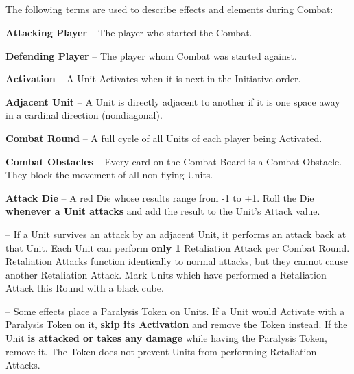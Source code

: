 \begin{multicols*}{2}
\subsection*{}
The following terms are used to describe effects and elements during Combat:\par
\textbf{Attacking Player} – The player who started the Combat.\par
\textbf{Defending Player} – The player whom Combat was started against.\par
\textbf{Activation} – A Unit Activates when it is next in the Initiative order.\par
\textbf{Adjacent Unit} – A Unit is directly adjacent to another if it is one space away in a cardinal direction (nondiagonal).\par
\textbf{Combat Round} – A full cycle of all Units of each player being Activated.\par
\textbf{Combat Obstacles} – Every card on the Combat Board is a Combat Obstacle.
They block the movement of all non-flying Units.\smallskip\par
{}\parbox{0.7\hsize}{\textbf{Attack Die} – A red Die whose results range from -1 to +1.
Roll the Die \textbf{whenever a Unit attacks} and
add the result to the Unit's Attack value.}\par\smallskip
\textbf{} – If a Unit survives an attack by an adjacent Unit, it performs an attack back at that Unit.
Each Unit can perform \textbf{only 1} Retaliation Attack per Combat Round.
Retaliation Attacks function identically to normal attacks, but they cannot cause another Retaliation Attack.
Mark Units which have performed a Retaliation Attack this Round with a black cube.\par
\textbf{}  – Some effects place a Paralysis Token on Units.
If a Unit would Activate with a Paralysis Token on it, \textbf{skip its Activation} and remove the Token instead.
If the Unit \textbf{is attacked or takes any damage} while having the Paralysis Token, remove it.
The Token does not prevent Units from performing Retaliation Attacks.\par

\end{multicols*}
